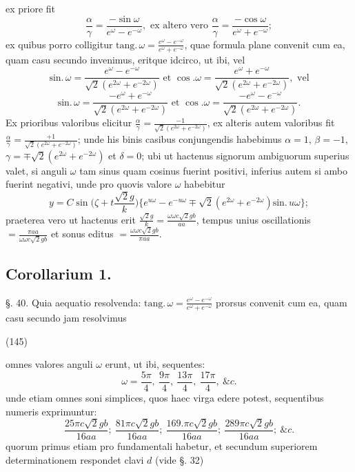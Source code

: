 \documentclass[11pt,a4paper]{article}
\begin{document}
ex priore fit
\[ \frac{\alpha}{\gamma}=\frac{-\sin \omega}{e^{\omega}-e^{-\omega}}, \text{ ex altero vero } \frac{\alpha}{\gamma}=\frac{-\cos\omega}{e^{\omega}+e^{-\omega}}; \]
ex quibus porro colligitur $\text{tang.}\,\omega=\frac{e^{\omega}-e^{-\omega}}{e^{\omega}+e^{-\omega}}$, quae formula plane
convenit cum ea, quam casu secundo invenimus, eritque idcirco,
ut ibi, vel
\[ \text{sin.}\,\omega=\frac{e^{\omega}-e^{-\omega}}{\surd 2(e^{2\omega}+e^{-2\omega})} \text{ et } \cos.\omega=\frac{e^{\omega}+e^{-\omega}}{\surd 2(e^{2\omega}+e^{-2\omega})}, \text{ vel} \]
\[ \text{sin.}\,\omega=\frac{-e^{\omega}+e^{-\omega}}{\surd 2(e^{2\omega}+e^{-2\omega})} \text{ et } \cos.\omega=\frac{-e^{\omega}-e^{-\omega}}{\surd 2(e^{2\omega}+e^{-2\omega})}. \]
Ex prioribus valoribus elicitur $\frac{\alpha}{\gamma}=\frac{-1}{\surd 2(e^{2\omega}+e^{-2\omega})}$, ex alteris
autem valoribus fit $\frac{\alpha}{\gamma}=\frac{+1}{\surd 2(e^{2\omega}+e^{-2\omega})}$; unde his binis
casibus conjungendis habebimus $\alpha=1$, $\beta=-1$, 
$\gamma=\mp\surd 2(e^{2\omega}+e^{-2\omega})$ et $\delta=0$; ubi ut hactenus signorum
ambiguorum superius valet, si anguli $\omega$ tam sinus quam
cosinus fuerint positivi, inferius autem si ambo fuerint
negativi, unde pro quovis valore $\omega$ habebitur
\[ y=C\sin \Big(\zeta+t\frac{\surd 2g}{k}\Big)\big\{e^{u\omega}-e^{-u\omega}\mp\surd 2(e^{2\omega}+e^{-2\omega})\text{sin.}\,u\omega\big\}; \]
praeterea vero ut hactenus erit $\frac{\surd 2g}{k}=\frac{\omega\omega c\surd 2gb}{aa}$, tempus
unius oscillationis $=\frac{\pi aa}{\omega\omega c\surd 2gb}$ et sonus editus $=\frac{\omega\omega c\surd 2gb}{\pi aa}$.

\subsection{Corollarium 1.}

§. 40. Quia aequatio resolvenda: $\text{tang.}\,\omega=\frac{e^{\omega}-e^{-\omega}}{e^{\omega}+e^{-\omega}}$
prorsus convenit cum ea, quam casu secundo jam resolvimus

(145)

omnes valores anguli $\omega$ erunt, ut ibi, sequentes:
\[ \omega=\frac{5\pi}{4},\ \frac{9\pi}{4},\ \frac{13\pi}{4},\ \frac{17\pi}{4},\ \&c. \]
unde etiam omnes soni simplices, quos haec virga edere potest,
sequentibus numeris exprimuntur:
\[ \frac{25\pi c\surd 2gb}{16aa};\ \frac{81\pi c\surd 2gb}{16aa};\ \frac{169.\pi c\surd 2gb}{16aa};\ \frac{289\pi c\surd 2gb}{16aa};\ \&c. \]
quorum primus etiam pro fundamentali habetur, et secundum
superiorem determinationem respondet clavi $d$ (vide §. 32)
\end{document}
